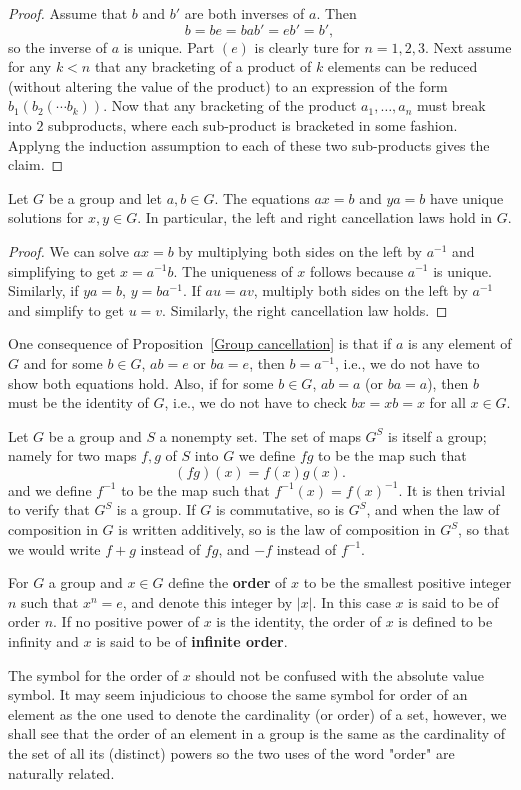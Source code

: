 \begin{proof}
Assume that $b$ and $b'$ are both inverses of $a$. Then
\[b=be=bab'=eb'=b',\]
so the inverse of $a$ is unique. Part $(e)$ is clearly ture for $n=1,2,3$. Next assume for any $k<n$ that any bracketing of a product of $k$ elements can be reduced (without altering the value of the product) to an expression of the form $b_1(b_2(\cdots b_k))$. Now that any bracketing of the product $a_1,\dots,a_n$ must break into $2$ subproducts, where each sub-product is bracketed in some fashion. Applyng the induction assumption to each of these two sub-products gives the claim.
\end{proof}
\begin{proposition}\label{Group cancellation}
Let $G$ be a group and let $a,b\in G$. The equations $ax=b$ and $ya=b$ have unique solutions for $x,y\in G$. In particular, the left and right cancellation laws hold in $G$.
\end{proposition}
\begin{proof}
We can solve $ax=b$ by multiplying both sides on the left by $a^{-1}$ and simplifying to get $x=a^{-1}b$. The uniqueness of $x$ follows because $a^{-1}$ is unique. Similarly, if $ya=b$, $y=ba^{-1}$. If $au=av$, multiply both sides on the left by $a^{-1}$ and simplify to get $u=v$. Similarly, the right cancellation law holds.
\end{proof}
One consequence of Proposition~\ref{Group cancellation} is that if $a$ is any element of $G$ and for some $b\in G$, $ab=e$ or $ba=e$, then $b=a^{-1}$, i.e., we do not have to show both equations hold. Also, if for some $b\in G$, $ab=a$ (or $ba=a$), then $b$ must be the identity of $G$, i.e., we do not have to check $bx=xb=x$ for all $x\in G$.
\begin{example}
Let $G$ be a group and $S$ a nonempty set. The set of maps $G^S$ is itself a group; namely for two maps $f,g$ of $S$ into $G$ we define $fg$ to be the map such that
\[(fg)(x)=f(x)g(x).\]
and we define $f^{-1}$ to be the map such that $f^{-1}(x)=f(x)^{-1}$. It is then trivial to verify that $G^S$ is a group. If $G$ is commutative, so is $G^S$, and when the law of composition in $G$ is written additively, so is the law of composition in $G^S$, so that we would write $f+g$ instead of $fg$, and $-f$ instead of $f^{-1}$.
\end{example}
\begin{definition}
For $G$ a group and $x\in G$ define the \textbf{order} of $x$ to be the smallest positive integer $n$ such that $x^n=e$, and denote this integer by $|x|$. In this case $x$ is said to be of order $n$. If no positive power of $x$ is the identity, the order of $x$ is defined to be infinity and $x$ is said to be of \textbf{infinite order}.
\end{definition}
The symbol for the order of $x$ should not be confused with the absolute value symbol. It may seem injudicious to choose the same symbol for order of an element as the one used to denote the cardinality (or order) of a set, however, we shall see that the order of an element in a group is the same as the cardinality of the set of all its (distinct) powers so the two uses of the word "order" are naturally related.
